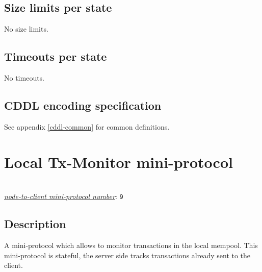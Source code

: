 \subsection{Size limits per state}

No size limits.

\subsection{Timeouts per state}

No timeouts.

\subsection{CDDL encoding specification}

See appendix \ref{cddl-common} for common definitions.

\section{Local Tx-Monitor mini-protocol}
\\
\hyperref[table:node-to-client-protocol-numbers]{\textit{node-to-client mini-protocol number}}: \texttt{9}\\
\label{local-tx-monitor-protocol}
\newcommand{\MsgAwaitAcquire}{\msg{MsgAwaitAcquire}}

\newcommand{\NextTx}{\state{NextTx}}
\newcommand{\MsgNextTx}{\msg{MsgNextTx}}
\newcommand{\MsgReplyNextTx}{\msg{MsgReplyNextTx}}

\newcommand{\MsgHasTx}{\msg{MsgHasTx}}
\newcommand{\HasTx}{\state{HasTx}}
\newcommand{\MsgReplyHasTx}{\msg{MsgReplyHasTx}}

\newcommand{\GetSizes}{\state{GetSizes}}
\newcommand{\MsgGetSizes}{\msg{MsgGetSizes}}
\newcommand{\MsgReplyGetSizes}{\msg{MsgReplyGetSizes}}

\subsection{Description}

A mini-protocol which allows to monitor transactions in the local mempool. This
mini-protocol is stateful, the server side tracks transactions already sent to
the client.

